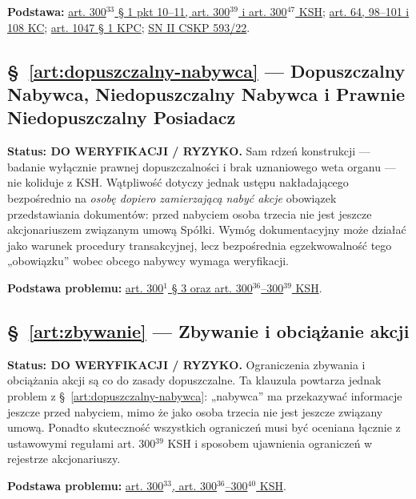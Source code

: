 \documentclass[12pt,a4paper]{report}
\begin{document}
\textbf{Podstawa:} \href{https://eli.gov.pl/api/acts/DU/2024/18/text.html}{art. 300$^{33}$ § 1 pkt 10--11, art. 300$^{39}$ i art. 300$^{47}$ KSH}; \href{https://eli.gov.pl/eli/DU/2026/795/ogl}{art. 64, 98--101 i 108 KC}; \href{https://eli.gov.pl/eli/DU/2026/468/ogl}{art. 1047 § 1 KPC}; \href{https://www.sn.pl/sites/orzecznictwo/OrzeczeniaHTML/ii%20cskp%20593-22.docx.html}{SN II CSKP 593/22}.

\subsection*{§~\ref{art:dopuszczalny-nabywca} — Dopuszczalny Nabywca, Niedopuszczalny Nabywca i Prawnie Niedopuszczalny Posiadacz}
\textbf{Status: DO WERYFIKACJI / RYZYKO.} Sam rdzeń konstrukcji — badanie wyłącznie prawnej dopuszczalności i brak uznaniowego weta organu — nie koliduje z KSH. Wątpliwość dotyczy jednak ustępu nakładającego bezpośrednio na \emph{osobę dopiero zamierzającą nabyć akcje} obowiązek przedstawiania dokumentów: przed nabyciem osoba trzecia nie jest jeszcze akcjonariuszem związanym umową Spółki. Wymóg dokumentacyjny może działać jako warunek procedury transakcyjnej, lecz bezpośrednia egzekwowalność tego „obowiązku” wobec obcego nabywcy wymaga weryfikacji.

\textbf{Podstawa problemu:} \href{https://eli.gov.pl/api/acts/DU/2024/18/text.html}{art. 300$^{1}$ § 3 oraz art. 300$^{36}$--300$^{39}$ KSH}.

\subsection*{§~\ref{art:zbywanie} — Zbywanie i obciążanie akcji}
\textbf{Status: DO WERYFIKACJI / RYZYKO.} Ograniczenia zbywania i obciążania akcji są co do zasady dopuszczalne. Ta klauzula powtarza jednak problem z §~\ref{art:dopuszczalny-nabywca}: „nabywca” ma przekazywać informacje jeszcze przed nabyciem, mimo że jako osoba trzecia nie jest jeszcze związany umową. Ponadto skuteczność wszystkich ograniczeń musi być oceniana łącznie z ustawowymi regułami art. 300$^{39}$ KSH i sposobem ujawnienia ograniczeń w rejestrze akcjonariuszy.

\textbf{Podstawa problemu:} \href{https://eli.gov.pl/api/acts/DU/2024/18/text.html}{art. 300$^{33}$, art. 300$^{36}$--300$^{40}$ KSH}.
\end{document}
